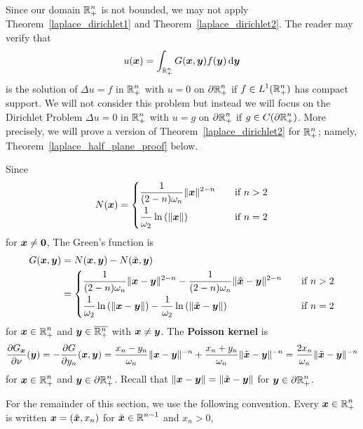 Since our domain $\displaystyle \mathbb{R}^n_+$ is not bounded, we may not apply
Theorem~\ref{laplace_dirichlet1} and
Theorem~\ref{laplace_dirichlet2}.  The reader may verify that
\[
u({\bm{x}}) = \int_{\mathbb{R}^n_+} G({\bm{x}},{\bm{y}})f({\bm{y}}) \,\mathrm{d}{{\bm{y}}}
\]
is the solution of $\Delta u = f$ in $\displaystyle \mathbb{R}^n_+$ with $u = 0$ on
$\displaystyle \partial \mathbb{R}^n_+$ if
$\displaystyle f \in L^1(\mathbb{R}^n_+)$ has compact support.  We
will not consider this problem but instead we will focus on the
Dirichlet Problem $\Delta u = 0$ in $\displaystyle \mathbb{R}^n_+$ with $u=g$ on
$\displaystyle \partial \mathbb{R}^n_+$ if
$\displaystyle g \in C(\partial \mathbb{R}^n_+)$.  More precisely, we
will prove a version of Theorem~\ref{laplace_dirichlet2} for
$\displaystyle \mathbb{R}^n_+$; namely,
Theorem~\ref{laplace_half_plane_proof} below.

Since
\[
N({\bm{x}}) =
\begin{cases}
\displaystyle \frac{1}{(2-n)\omega_n} \|{\bm{x}}\|^{2-n} & \quad 
\text{if} \ n>2 \\[0.8em]
\displaystyle \frac{1}{\omega_2} \ln\left(\|{\bm{x}}\|\right) & \quad 
\text{if} \ n=2
\end{cases}
\]
for ${\bm{x}} \neq {\bm{0}}$, The Green's function is
\begin{align*}
G({\bm{x}},{\bm{y}}) &= N({\bm{x}},{\bm{y}}) - N(\tilde{{\bm{x}}},{\bm{y}}) \\
&=
\begin{cases}
\displaystyle \frac{1}{(2-n)\omega_n} \|{\bm{x}}-{\bm{y}}\|^{2-n} -
\frac{1}{(2-n)\omega_n} \|\tilde{{\bm{x}}}-{\bm{y}}\|^{2-n} & \quad 
\text{if} \ n>2 \\[0.8em]
\displaystyle \frac{1}{\omega_2} \ln\left(\|{\bm{x}}-{\bm{y}}\|\right) -
\frac{1}{\omega_2} \ln\left(\|\tilde{{\bm{x}}}-{\bm{y}}\|\right) & \quad 
\text{if} \ n=2
\end{cases}
\end{align*}
for $\displaystyle {\bm{x}} \in \mathbb{R}^n_+$ and
$\displaystyle {\bm{y}}\in \overline{\mathbb{R}^n_+}$ with
${\bm{x}} \neq {\bm{y}}$.  The
{\bfseries Poisson kernel} is
\[
\frac{\partial{G_{{\bm{x}}}}}{\partial \nu}({\bm{y}}) = -\frac{\partial{G}}{\partial y_n}({\bm{x}},{\bm{y}}) =
\frac{x_n-y_n}{\omega_n} \|{\bm{x}}-{\bm{y}}\|^{-n}
+\frac{x_n+y_n}{\omega_n} \|\tilde{{\bm{x}}}-{\bm{y}}\|^{-n}
= \frac{2x_n}{\omega_n} \|\tilde{{\bm{x}}}-{\bm{y}}\|^{-n}
\]
for $\displaystyle {\bm{x}} \in \mathbb{R}^n_+$ and
$\displaystyle {\bm{y}} \in \partial \mathbb{R}^n_+$.  Recall
that $\|{\bm{x}}-{\bm{y}}\| = \|\tilde{{\bm{x}}}-{\bm{y}}\|$ for
$\displaystyle {\bm{y}} \in \partial \mathbb{R}^n_+$.

For the remainder of this section, we use the following convention.
Every $\displaystyle {\bm{x}}\in \mathbb{R}^n_+$ is written 
${\bm{x}} = (\breve{{\bm{x}}}, x_n)$ for
$\displaystyle \breve{{\bm{x}}} \in \mathbb{R}^{n-1}$ and $x_n>0$,

